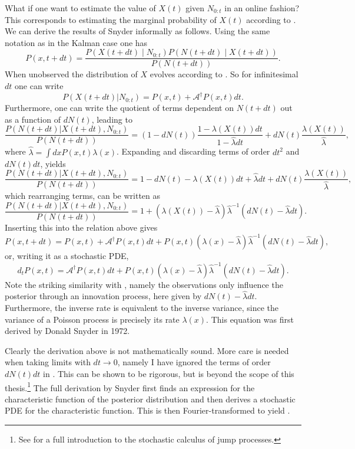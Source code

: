 {What if one want to estimate the value of $X(t)$ given $N_{0:t}$ in an online fashion? This corresponds to estimating the marginal probability of $X(t)$ according to
.
We can derive the results of Snyder informally as follows. Using the same notation as in the Kalman case one has
\[
P(x,t+dt) =\frac{ P\left(X(t+dt)\middle|N_{0:t}\right)P\left(N(t+dt)\middle|X(t+dt)\right)}{P(N(t+dt))}.
\]
When unobserved the distribution of $X$ evolves according to . So for infinitesimal $dt$ one can write 
\[
P(X(t+dt)|N_{0:t}) = P(x,t) + \mathcal{A}^\dagger P(x,t) dt.
\]
Furthermore, one can write the quotient of terms dependent on $N(t+dt)$ out as a function of $dN(t)$, leading to
\[
\frac{P(N(t+dt)|X(t+dt),N_{0:t})}{P(N(t+dt))} = (1-dN(t))\frac{1-\lambda(X(t))dt}{1-\hat{\lambda}dt} + dN(t)\frac{\lambda(X(t))}{\hat{\lambda}},
\]
where $\hat{\lambda} = \int dx P(x,t) \lambda(x)$. Expanding and discarding terms of order $dt^2$ and $dN(t)dt$, yields
\[
\frac{P(N(t+dt)|X(t+dt),N_{0:t})}{P(N(t+dt))} = 1-dN(t) -\lambda(X(t))dt +\hat{\lambda}dt +dN(t)\frac{\lambda(X(t))}{\hat{\lambda}},
\]
which rearranging terms, can be written as
\[
\frac{P(N(t+dt)|X(t+dt),N_{0:t})}{P(N(t+dt))} = 1 + \left(\lambda(X(t))-\hat{\lambda}\right)\hat{\lambda}^{-1}\left(dN(t)-\hat{\lambda} dt\right).
\]
Inserting this into the relation above gives
\[
P(x,t+dt) = P(x,t) +\mathcal{A}^\dagger P(x,t) dt + P(x,t)\left(\lambda(x)-\hat{\lambda}\right)\hat{\lambda}^{-1}\left(dN(t)-\hat{\lambda} dt\right),
\]
or, writing it as a stochastic PDE,
\begin{equation}
\label{eq:snyder_uni}
d_t P(x,t) = \mathcal{A}^\dagger P(x,t) dt + P(x,t)\left(\lambda(x)-\hat{\lambda}\right)\hat{\lambda}^{-1}\left(dN(t)-\hat{\lambda} dt\right).
\end{equation}
Note the striking similarity with , namely the observations only influence the posterior through an innovation process, here given by $dN(t)-\hat{\lambda}dt$. Furthermore, the inverse rate is equivalent to the inverse variance, since the variance of a Poisson process is precisely its rate $\lambda(x)$. This equation was first derived by Donald Snyder in 1972.
\par
Clearly the derivation above is not mathematically sound. More care is needed when taking limits with $dt\to 0$, namely I have ignored the terms of order $dN(t) dt$ 
in . This can be shown to be rigorous, but is beyond the scope of this thesis.\footnote{See  for a full introduction to the stochastic
calculus of jump processes.} The full derivation by Snyder first finds an expression for the 
characteristic function of the posterior distribution and then derives a stochastic PDE for the characteristic function. This is then Fourier-transformed to yield 
.

}
